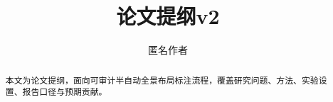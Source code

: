 \documentclass[journal,onecolumn]{IEEEtran}
\title{论文提纲v2}
\author{匿名作者}
\date{}
\begin{document}
\maketitle

\begin{abstract}
本文为论文提纲，面向可审计半自动全景布局标注流程，覆盖研究问题、方法、实验设置、报告口径与预期贡献。
\end{abstract}

\begin{IEEEkeywords}
\end{IEEEkeywords}

\tableofcontents







% 
% 

\appendix




\clearpage
\nocite{kara2018,liu2018}


\end{document}
